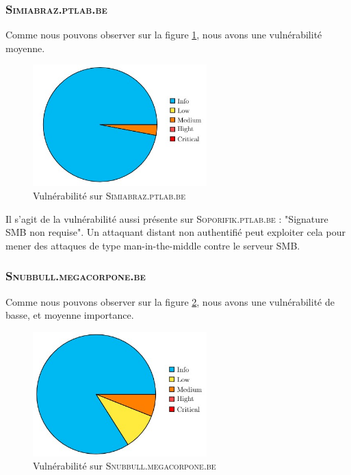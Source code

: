 \documentclass[a4paper]{article}
\begin{document}
\subsubsection{\textsc{Simiabraz.ptlab.be}}\label{app:vulns3}
Comme nous pouvons observer sur la figure \ref{fig:vuln3}, nous avons une vulnérabilité moyenne.
\begin{figure}[H]
    \centering
    \includegraphics[width=0.6\textwidth]{images/graphiques/5.jpg}
    \caption{Vulnérabilité sur \textsc{Simiabraz.ptlab.be}}
    \label{fig:vuln3}
\end{figure}

Il s'agit de la vulnérabilité aussi présente sur \textsc{Soporifik.ptlab.be} : "Signature SMB non requise". Un attaquant distant non authentifié peut exploiter cela pour mener des attaques de type man-in-the-middle contre le serveur SMB.















\subsubsection{\textsc{Snubbull.megacorpone.be}}\label{app:vulns4}
Comme nous pouvons observer sur la figure \ref{fig:vuln4}, nous avons une vulnérabilité de basse, et moyenne importance.
\begin{figure}[H]
    \centering
    \includegraphics[width=0.6\textwidth]{images/graphiques/6.jpg}
    \caption{Vulnérabilité sur \textsc{Snubbull.megacorpone.be}}
    \label{fig:vuln4}
\end{figure}
\end{document}
